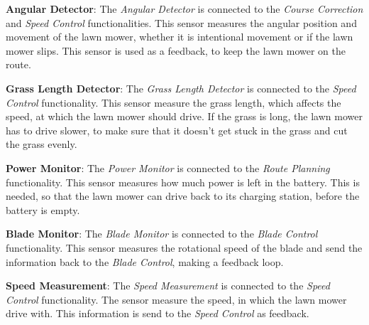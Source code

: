 \textbf{Angular Detector}:
The \textit{Angular Detector} is connected to the \textit{Course Correction} and \textit{Speed Control} functionalities. This sensor measures the angular position and movement of the lawn mower, whether it is intentional movement or if the lawn mower slips. This sensor is used as a feedback, to keep the lawn mower on the route.

\textbf{Grass Length Detector}:
The \textit{Grass Length Detector} is connected to the \textit{Speed Control} functionality. This sensor measure the  grass length, which affects the speed, at which the lawn mower should drive. If the grass is long, the lawn mower has to drive slower, to make sure that it doesn't get stuck in the grass and cut the grass evenly. 

\textbf{Power Monitor}:
The \textit{Power Monitor} is connected to the \textit{Route Planning} functionality. This sensor measures how much power  is left in the battery. This is needed, so that the lawn mower can drive back to its charging station, before the battery is empty.

\textbf{Blade Monitor}:
The \textit{Blade Monitor} is connected to the \textit{Blade Control} functionality. This sensor measures the rotational speed of the blade and send the information back to the \textit{Blade Control}, making a feedback loop.

\textbf{Speed Measurement}:
The \textit{Speed Measurement} is connected to the \textit{Speed Control} functionality. The sensor measure the speed, in which the lawn mower drive with. This information is send to the \textit{Speed Control} as feedback.